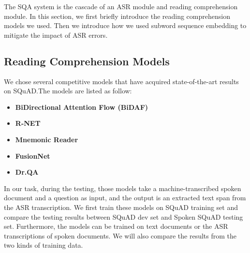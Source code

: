 \documentclass[a4paper]{article}
\begin{document}
The SQA system is the cascade of an ASR module and reading comprehension module. 
In this section, we first briefly introduce the reading comprehension models we used. 
Then we introduce how we used subword sequence embedding  to mitigate the impact of ASR errors.

\subsection{Reading Comprehension Models}

We chose several competitive models that have acquired state-of-the-art results on SQuAD.The models  are listed as follow:
\begin{itemize}
\item \textbf{BiDirectional Attention Flow (BiDAF)}~\cite{seo2016bidirectional}

\item \textbf{R-NET}~\cite{wang2017gated}
  
\item \textbf{Mnemonic Reader}~\cite{hu2017reinforced}
  \item \textbf{FusionNet}~\cite{huang2017fusionnet}
  \item \textbf{Dr.QA}~\cite{chen2017reading}
  \end{itemize}
In our task, during the testing, those models take a machine-transcribed spoken document and a question as input, and the output is an extracted text span from the ASR transcription. We first train these models on SQuAD training set and compare the testing results between SQuAD dev set and Spoken SQuAD testing set.
Furthermore, the models can be trained on text documents or the ASR transcriptions of spoken documents. 
We will also compare the results from the two kinds of training data.
\end{document}
